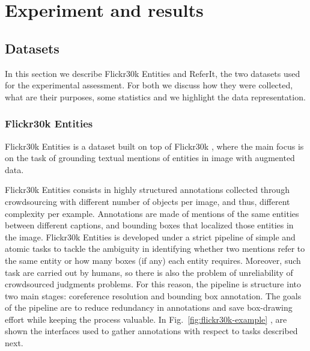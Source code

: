 
\chapter{Experiment and results}
\label{ch:experiments}

\section{Datasets}
\label{sec:datasets}

In this section we describe Flickr30k Entities and ReferIt, the two
datasets used for the experimental assessment. For both we discuss how
they were collected, what are their purposes, some statistics and we
highlight the data representation.

\subsection{Flickr30k Entities}
\label{subsec:flickr30k}

Flickr30k Entities \cite{plummer2015flickr30k} is a dataset built on
top of Flickr30k \cite{young2014image}, where the main focus is on the
task of grounding textual mentions of entities in image with augmented
data.

Flickr30k Entities consists in highly structured annotations collected
through crowdsourcing with different number of objects per image, and
thus, different complexity per example. Annotations are made of
mentions of the same entities between different captions, and bounding
boxes that localized those entities in the image. Flickr30k Entities
is developed under a strict pipeline of simple and atomic tasks to
tackle the ambiguity in identifying whether two mentions refer to the
same entity or how many boxes (if any) each entity requires. Moreover,
such task are carried out by humans, so there is also the problem of
unreliability of crowdsourced judgments problems. For this reason, the
pipeline is structure into two main stages: coreference resolution and
bounding box annotation. The goals of the pipeline are to reduce
redundancy in annotations and save box-drawing effort while keeping
the process valuable. In Fig.~\ref{fig:flickr30k-example}
\cite{plummer2015flickr30k}, are shown the interfaces used to gather
annotations with respect to tasks described next.

